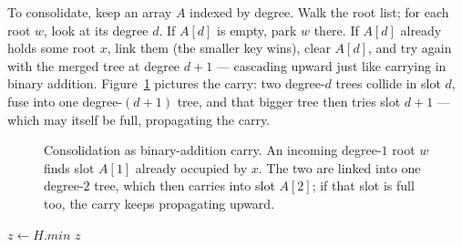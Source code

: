 To consolidate, keep an array $A$ indexed by degree. Walk the root list; for each
root $w$, look at its degree $d$. If $A[d]$ is empty, park $w$ there. If $A[d]$
already holds some root $x$, link them (the smaller key wins), clear $A[d]$, and
try again with the merged tree at degree $d+1$ --- cascading upward just like
carrying in binary addition. Figure~\ref{ch20:degarray} pictures the carry: two
degree-$d$ trees collide in slot $d$, fuse into one degree-$(d{+}1)$ tree, and
that bigger tree then tries slot $d{+}1$ --- which may itself be full, propagating
the carry.

\begin{figure}[H]
\centering
{}
\caption{Consolidation as binary-addition carry. An incoming degree-$1$ root $w$
finds slot $A[1]$ already occupied by $x$. The two are linked into one degree-$2$
tree, which then carries into slot $A[2]$; if that slot is full too, the carry
keeps propagating upward.}
\label{ch20:degarray}
\end{figure}

\begin{algorithm}[H]
\caption{\textsc{FibHeap-Extract-Min}($H$)}
$z \gets H.\mathit{min}$\;
\Return $z$\;
\end{algorithm}

